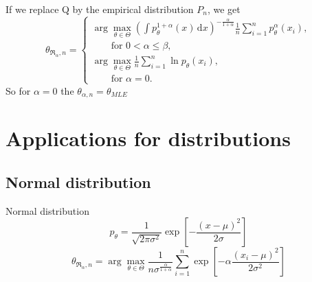 \documentclass[11pt,a4paper]{beamer}
\newcommand{\intpa}{\int p_\theta^{1+\alpha}(x) \, \mathrm{d}x }
\newcommand{\fn}{\frac{1}{n} \sum_{i=1}^n p_{\theta}^{\alpha}\left( x_i \right)}
\newcommand{\fln}{\frac{1}{n} \sum_{i=1}^n \ln p_{\theta}\left( x_i \right)}
\newcommand{\amtiT}{\arg \max_{\theta \in \Theta}}
\begin{document}

\begin{frame}
If we replace Q by the empirical distribution $P_n$, we get
\begin{equation*}
	\theta_{\mathfrak{R}_\alpha,n} = 
	\begin{cases}
		\displaystyle{ \amtiT \left( \intpa \right)^{-\frac{\alpha}{1+\alpha}} \fn }, \\
		\qquad \text{for } 0 < \alpha \leq \beta, \\
		\displaystyle{ \amtiT  \fln },\\
		\qquad \text{for } \alpha = 0.
	\end{cases}	
\end{equation*}
	So for $\alpha = 0 $ the $\theta_{\alpha,n} = \theta_{MLE}$
\end{frame}

\section{Applications for distributions}
\subsection{Normal distribution}   %
\begin{frame}{Normal distribution}
	\begin{equation*}
		p_\theta = \frac{1}{\sqrt{2\pi\sigma^2}}\exp{\left[ -\frac{(x-\mu)^2}{2\sigma} \right]}
	\end{equation*}
	\begin{equation*}
		\theta_{\mathfrak{R}_\alpha,n} = \amtiT \frac{1}{n\sigma^{\frac{\alpha}{1+\alpha}}} \sum_{i=1}^n \exp \left[ -\alpha \frac{(x_i - \mu)^2}{2\sigma^2} \right]		
	\end{equation*}
\end{frame}
\end{document}
